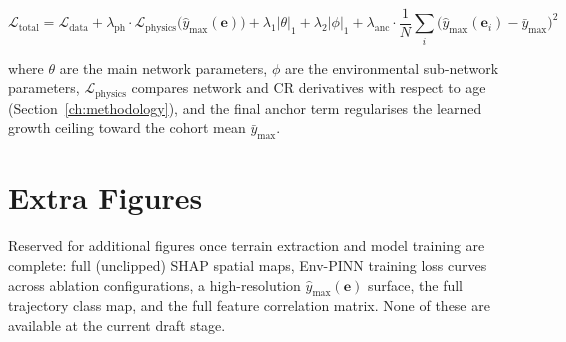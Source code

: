 \[
\mathcal{L}_{\text{total}} = \mathcal{L}_{\text{data}} + \lambda_{\text{ph}} \cdot \mathcal{L}_{\text{physics}}\big(\hat{y}_{\max}(\mathbf{e})\big) + \lambda_1 |\theta|_1 + \lambda_2 |\phi|_1 + \lambda_{\text{anc}} \cdot \frac{1}{N}\sum_i \big(\hat{y}_{\max}(\mathbf{e}_i) - \bar{y}_{\max}\big)^2
\]

where $\theta$ are the main network parameters, $\phi$ are the environmental sub-network parameters, $\mathcal{L}_{\text{physics}}$ compares network and CR derivatives with respect to age (Section~\ref{ch:methodology}), and the final anchor term regularises the learned growth ceiling toward the cohort mean $\bar{y}_{\max}$.

\chapter{Extra Figures}
\label{app:extra-figures}

Reserved for additional figures once terrain extraction and model training are complete: full (unclipped) SHAP spatial maps, Env-PINN training loss curves across ablation configurations, a high-resolution $\hat{y}_{\max}(\mathbf{e})$ surface, the full trajectory class map, and the full feature correlation matrix. None of these are available at the current draft stage.
